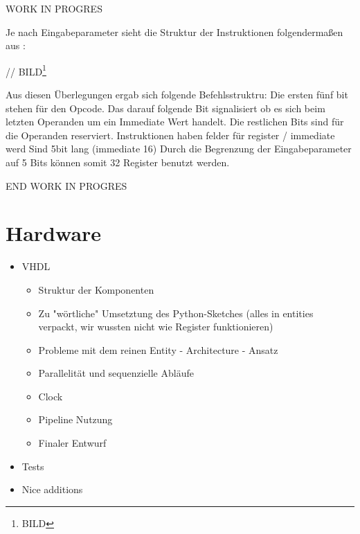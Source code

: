 \documentclass[paper=a4,fontsize=12pt,twocolumn]{scrreprt}
\begin{document}
{\color{green} WORK IN PROGRES}

Je nach Eingabeparameter sieht die Struktur der Instruktionen folgendermaßen aus :

// BILD\footnote{BILD}

Aus diesen Überlegungen ergab sich folgende Befehlsstruktru: Die ersten fünf bit stehen für den Opcode.
Das darauf folgende Bit signalisiert ob es sich beim letzten Operanden um ein Immediate Wert handelt.
Die restlichen Bits sind für die Operanden reserviert.
Instruktionen haben felder für register / immediate werd
Sind 5bit lang (immediate 16)
Durch die Begrenzung der Eingabeparameter auf 5 Bits können somit 32 Register benutzt werden.

{\color{green}END WORK IN PROGRES}

\chapter{Hardware}


\begin{itemize}
    \item VHDL
    \begin{itemize}
        \item Struktur der Komponenten
        \item Zu "wörtliche" Umsetztung des Python-Sketches (alles in entities verpackt, wir wussten nicht wie Register funktionieren)
        \item Probleme mit dem reinen Entity - Architecture - Ansatz
        \item Parallelität und sequenzielle Abläufe
        \item Clock
        \item Pipeline Nutzung
        \item Finaler Entwurf
    \end{itemize}
    \item Tests
    \item Nice additions
\end{itemize}
\end{document}
